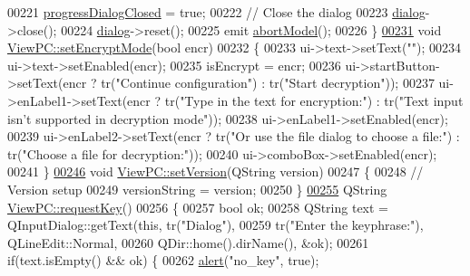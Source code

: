 \begin{DoxyCode}
00221     \hyperlink{class_view_p_c_add8c82aa2b0b934212aa5bde9277ab36}{progressDialogClosed} = \textcolor{keyword}{true};
00222     \textcolor{comment}{// Close the dialog}
00223     \hyperlink{class_view_p_c_a31abbb470fe329b44e6ffee202b903ca}{dialog}->close();
00224     \hyperlink{class_view_p_c_a31abbb470fe329b44e6ffee202b903ca}{dialog}->reset();
00225     emit \hyperlink{class_view_p_c_aa652102ce6b5757b8eef830409c8cabf}{abortModel}();
00226 \}
\hypertarget{viewpc_8cpp_source.tex_l00231}{}\hyperlink{class_view_p_c_a5b48951efefdc0e3039c9a4bf185320b}{00231} \textcolor{keywordtype}{void} \hyperlink{class_view_p_c_a5b48951efefdc0e3039c9a4bf185320b}{ViewPC::setEncryptMode}(\textcolor{keywordtype}{bool} encr)
00232 \{
00233     ui->text->setText(\textcolor{stringliteral}{""});
00234     ui->text->setEnabled(encr);
00235     isEncrypt = encr;
00236     ui->startButton->setText(encr ? tr(\textcolor{stringliteral}{"Continue configuration"}) : tr(\textcolor{stringliteral}{"Start decryption"}));
00237     ui->enLabel1->setText(encr ? tr(\textcolor{stringliteral}{"Type in the text for encryption:"}) : tr(\textcolor{stringliteral}{"Text input isn't supported in
       decryption mode"}));
00238     ui->enLabel1->setEnabled(encr);
00239     ui->enLabel2->setText(encr ? tr(\textcolor{stringliteral}{"Or use the file dialog to choose a file:"}) : tr(\textcolor{stringliteral}{"Choose a file for
       decryption:"}));
00240     ui->comboBox->setEnabled(encr);
00241 \}
\hypertarget{viewpc_8cpp_source.tex_l00246}{}\hyperlink{class_view_p_c_ac05220df875b7c4f24405a5742476ebf}{00246} \textcolor{keywordtype}{void} \hyperlink{class_view_p_c_ac05220df875b7c4f24405a5742476ebf}{ViewPC::setVersion}(QString version)
00247 \{
00248     \textcolor{comment}{// Version setup}
00249     versionString = version;
00250 \}
\hypertarget{viewpc_8cpp_source.tex_l00255}{}\hyperlink{class_view_p_c_a559c95675ec98b15451f3bca47033d9c}{00255} QString \hyperlink{class_view_p_c_a559c95675ec98b15451f3bca47033d9c}{ViewPC::requestKey}()
00256 \{
00257     \textcolor{keywordtype}{bool} ok;
00258     QString text = QInputDialog::getText(\textcolor{keyword}{this}, tr(\textcolor{stringliteral}{"Dialog"}),
00259                                          tr(\textcolor{stringliteral}{"Enter the keyphrase:"}), QLineEdit::Normal,
00260                                          QDir::home().dirName(), &ok);
00261     \textcolor{keywordflow}{if}(text.isEmpty() && ok) \{
00262         \hyperlink{class_view_p_c_a7c467169467789561078abc9d4fe57bd}{alert}(\textcolor{stringliteral}{"no\_key"}, \textcolor{keyword}{true});

\end{DoxyCode}

